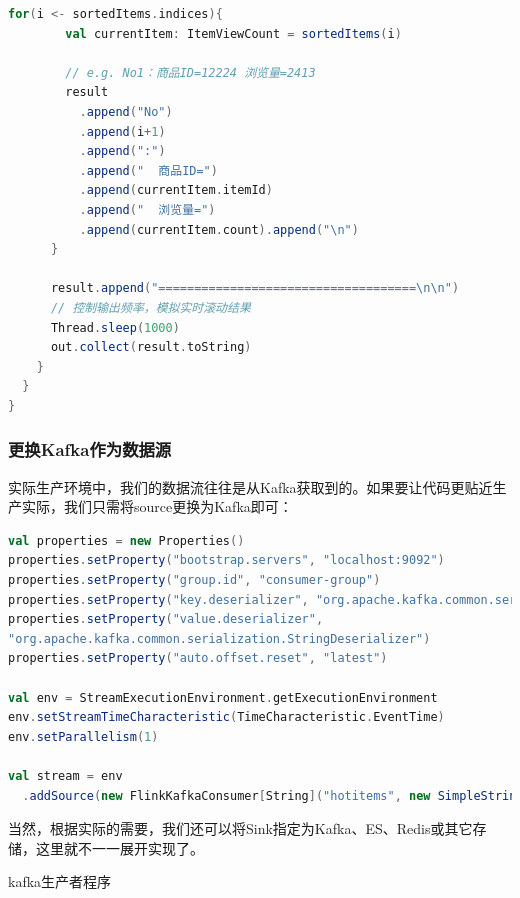 \documentclass[oneside]{ctexbook}
\begin{document}
\begin{lstlisting}[language=scala]
      for(i <- sortedItems.indices){
        val currentItem: ItemViewCount = sortedItems(i)

        // e.g. No1：商品ID=12224 浏览量=2413
        result
          .append("No")
          .append(i+1)
          .append(":")
          .append("  商品ID=")
          .append(currentItem.itemId)
          .append("  浏览量=")
          .append(currentItem.count).append("\n")
      }

      result.append("====================================\n\n")
      // 控制输出频率，模拟实时滚动结果
      Thread.sleep(1000)
      out.collect(result.toString)
    }
  }
}
\end{lstlisting}

\subsubsection{更换Kafka作为数据源}

实际生产环境中，我们的数据流往往是从Kafka获取到的。如果要让代码更贴近生产实际，我们只需将source更换为Kafka即可：

\begin{lstlisting}[language=scala]
val properties = new Properties()
properties.setProperty("bootstrap.servers", "localhost:9092")
properties.setProperty("group.id", "consumer-group")
properties.setProperty("key.deserializer", "org.apache.kafka.common.serialization.StringDeserializer")
properties.setProperty("value.deserializer",
"org.apache.kafka.common.serialization.StringDeserializer")
properties.setProperty("auto.offset.reset", "latest")

val env = StreamExecutionEnvironment.getExecutionEnvironment
env.setStreamTimeCharacteristic(TimeCharacteristic.EventTime)
env.setParallelism(1)

val stream = env
  .addSource(new FlinkKafkaConsumer[String]("hotitems", new SimpleStringSchema(), properties))
\end{lstlisting}

当然，根据实际的需要，我们还可以将Sink指定为Kafka、ES、Redis或其它存储，这里就不一一展开实现了。

kafka生产者程序
\end{document}
